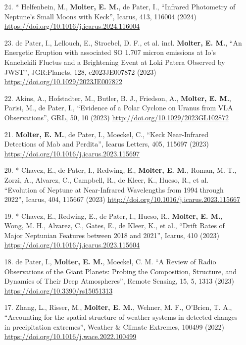\documentclass[margin, 10pt]{res} %
\begin{document}
\begin{resume}
{\begin{enumerate}
\item[24.]* Helfenbein, M., {\bf Molter, E. M.}, de Pater, I., ``Infrared Photometry of Neptune's Small Moons with Keck'', Icarus, 413, 116004 (2024) \url{https://doi.org/10.1016/j.icarus.2024.116004}

\item[23.] de Pater, I., Lellouch, E., Stroebel, D. F., et al. incl. {\bf Molter, E. M.}, ``An Energetic Eruption with associated SO 1.707 micron emissions at Io's Kanehekili Fluctus and a Brightening Event at Loki Patera Observed by JWST'', JGR:Planets, 128, e2023JE007872 (2023) \url{https://doi.org/10.1029/2023JE007872}
	
\item[22.] Akins, A., Hofstadter, M., Butler, B. J., Friedson, A., {\bf Molter, E. M.}, Parisi, M., de Pater, I., ``Evidence of a Polar Cyclone on Uranus from VLA Observations'', GRL, 50, 10 (2023) \url{http://doi.org/10.1029/2023GL102872}
	
\item[21.] {\bf Molter, E. M.}, de Pater, I., Moeckel, C., ``Keck Near-Infrared Detections of Mab and Perdita'', Icarus Letters, 405, 115697 (2023) \url{https://doi.org/10.1016/j.icarus.2023.115697}
	
\item[20.]* Chavez, E., de Pater, I., Redwing, E., {\bf Molter, E. M.}, Roman, M. T., Zorzi, A., Alvarez, C., Campbell, R., de Kleer, K., Hueso, R., et al. ``Evolution of Neptune at Near-Infrared Wavelengths from 1994 through 2022'', Icarus, 404, 115667  (2023) \url{http://doi.org/10.1016/j.icarus.2023.115667}

\item[19.]* Chavez, E., Redwing, E., de Pater, I., Hueso, R., {\bf Molter, E. M.}, Wong, M. H.,  Alvarez, C., Gates, E., de Kleer, K., et al.,  ``Drift Rates of Major Neptunian Features between 2018 and 2021'', Icarus, 410 (2023) \url{https://doi.org/10.1016/j.icarus.2023.115604}
	
\item[18.] de Pater, I., {\bf Molter, E. M.}, Moeckel, C. M. ``A Review of Radio Observations of the Giant Planets: Probing the Composition, Structure, and Dynamics of Their Deep Atmospheres'', Remote Sensing, 15, 5, 1313 (2023) \url{https://doi.org/10.3390/rs15051313}
	
\item[17.] Zhang, L., Risser, M., {\bf Molter, E. M.}, Wehner, M. F., O'Brien, T. A., ``Accounting for the spatial structure of weather systems in detected changes in precipitation extremes'', Weather \& Climate Extremes, 100499 (2022) \url{https://doi.org/10.1016/j.wace.2022.100499}


\end{enumerate}}
\end{resume}
\end{document}
